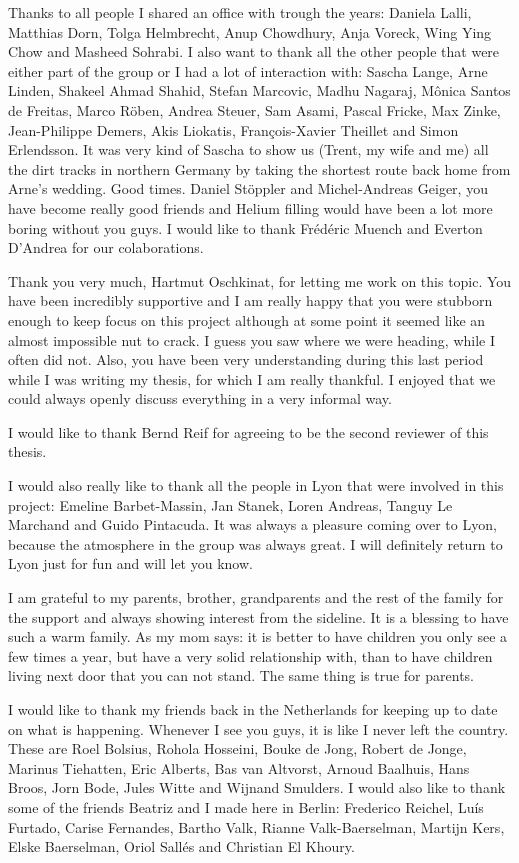 Thanks to all people I shared an office with trough the years: Daniela Lalli, Matthias Dorn, Tolga Helmbrecht, Anup Chowdhury, Anja Voreck, Wing Ying Chow and Masheed Sohrabi. I also want to thank all the other people that were either part of the group or I had a lot of interaction with: Sascha Lange, Arne Linden, Shakeel Ahmad Shahid, Stefan Marcovic, Madhu Nagaraj, Mônica Santos de Freitas, Marco Röben, Andrea Steuer, Sam Asami, Pascal Fricke, Max Zinke, Jean-Philippe Demers, Akis Liokatis, François-Xavier Theillet and Simon Erlendsson. It was very kind of Sascha to show us (Trent, my wife and me) all the dirt tracks in northern Germany by taking the shortest route back home from Arne's wedding. Good times. Daniel Stöppler and Michel-Andreas Geiger, you have become really good friends and Helium filling would have been a lot more boring without you guys. I would like to thank Frédéric Muench and Everton D'Andrea for our colaborations.

Thank you very much, Hartmut Oschkinat, for letting me work on this topic. You have been incredibly supportive and I am really happy that you were stubborn enough to keep focus on this project although at some point it seemed like an almost impossible nut to crack. I guess you saw where we were heading, while I often did not. Also, you have been very understanding during this last period while I was writing my thesis, for which I am really thankful. I enjoyed that we could always openly discuss everything in a very informal way.

I would like to thank Bernd Reif for agreeing to be the second reviewer of this thesis.

I would also really like to thank all the people in Lyon that were involved in this project: Emeline Barbet-Massin, Jan Stanek, Loren Andreas, Tanguy Le Marchand and Guido Pintacuda. It was always a pleasure coming over to Lyon, because the atmosphere in the group was always great. I will definitely return to Lyon just for fun and will let you know.

I am grateful to my parents, brother, grandparents and the rest of the family for the support and always showing interest from the sideline. It is a blessing to have such a warm family. As my mom says: it is better to have children you only see a few times a year, but have a very solid relationship with, than to have children living next door that you can not stand. The same thing is true for parents.

I would like to thank my friends back in the Netherlands for keeping up to date on what is happening. Whenever I see you guys, it is like I never left the country. These are Roel Bolsius, Rohola Hosseini, Bouke de Jong, Robert de Jonge, Marinus Tiehatten, Eric Alberts, Bas van Altvorst, Arnoud Baalhuis, Hans Broos, Jorn Bode, Jules Witte and Wijnand Smulders. I would also like to thank some of the friends Beatriz and I made here in Berlin: Frederico Reichel, Luís Furtado, Carise Fernandes, Bartho Valk, Rianne Valk-Baerselman, Martijn Kers, Elske Baerselman, Oriol Sallés and Christian El Khoury.

